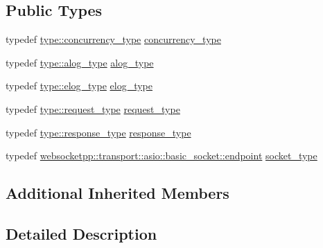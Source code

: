 \subsection*{Public Types}
\begin{DoxyCompactItemize}
\item 
typedef \hyperlink{structwebsocketpp_1_1config_1_1debug__core_aada73b9183fc032c25178870dbb4d83d}{type\+::concurrency\+\_\+type} \hyperlink{structwebsocketpp_1_1config_1_1debug__asio_1_1transport__config_a5ec379ff279ab5903870a071d70fa357}{concurrency\+\_\+type}
\item 
typedef \hyperlink{structwebsocketpp_1_1config_1_1debug__core_a2e57e38001385110ce0fbbd17af6b0af}{type\+::alog\+\_\+type} \hyperlink{structwebsocketpp_1_1config_1_1debug__asio_1_1transport__config_aa49a07a1e83d4dfa619ee7a93a27d8f9}{alog\+\_\+type}
\item 
typedef \hyperlink{structwebsocketpp_1_1config_1_1debug__core_acfa1ded7f80d6a7276b0ec3fd0859fc3}{type\+::elog\+\_\+type} \hyperlink{structwebsocketpp_1_1config_1_1debug__asio_1_1transport__config_ae5bdb28a825df63a36a14290d5230e27}{elog\+\_\+type}
\item 
typedef \hyperlink{structwebsocketpp_1_1config_1_1debug__core_a597de872d5a5b6e9bd2fa1af18ccbbc6}{type\+::request\+\_\+type} \hyperlink{structwebsocketpp_1_1config_1_1debug__asio_1_1transport__config_a4a6d4d4212e18ac8afe0a8b82ee4f925}{request\+\_\+type}
\item 
typedef \hyperlink{structwebsocketpp_1_1config_1_1debug__core_aa11255cb23f43afb8884bc464aa5c572}{type\+::response\+\_\+type} \hyperlink{structwebsocketpp_1_1config_1_1debug__asio_1_1transport__config_ab54324c27a7c70ed8ba69ba719156286}{response\+\_\+type}
\item 
typedef \hyperlink{classwebsocketpp_1_1transport_1_1asio_1_1basic__socket_1_1endpoint}{websocketpp\+::transport\+::asio\+::basic\+\_\+socket\+::endpoint} \hyperlink{structwebsocketpp_1_1config_1_1debug__asio_1_1transport__config_a6c62fefe51c2bdfec796778773aa6d8e}{socket\+\_\+type}
\end{DoxyCompactItemize}
\subsection*{Additional Inherited Members}


\subsection{Detailed Description}


